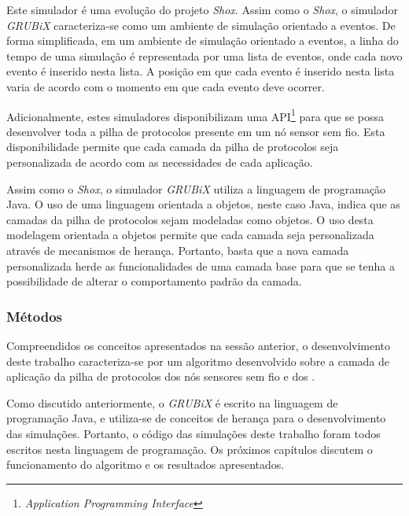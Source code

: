 Este simulador é uma evolução do projeto \emph{Shox}\cite{shox}. Assim como o \emph{Shox}, o simulador \emph{GRUBiX} caracteriza-se como um ambiente de simulação orientado a eventos. De forma simplificada, em um ambiente de simulação orientado a eventos, a linha do tempo de uma simulação é representada por uma lista de eventos, onde cada novo evento é inserido nesta lista. A posição em que cada evento é inserido nesta lista varia de acordo com o momento em que cada evento deve ocorrer.

Adicionalmente, estes simuladores disponibilizam uma API\footnote{\emph{Application Programming Interface}} para que se possa desenvolver toda a pilha de protocolos presente em um nó sensor sem fio. Esta disponibilidade permite que cada camada da pilha de protocolos seja personalizada de acordo com as necessidades de cada aplicação.

Assim como o \emph{Shox}, o simulador \emph{GRUBiX} utiliza a linguagem de programação Java. O uso de uma linguagem orientada a objetos, neste caso Java, indica que as camadas da pilha de protocolos sejam modeladas como objetos. O uso desta modelagem orientada a objetos permite que cada camada seja personalizada através de mecanismos de herança. Portanto, basta que a nova camada personalizada herde as funcionalidades de uma camada base para que se tenha a possibilidade de alterar o comportamento padrão da camada.

\subsubsection{Métodos}
Compreendidos os conceitos apresentados na sessão anterior, o desenvolvimento deste trabalho caracteriza-se por um algoritmo desenvolvido sobre a camada de aplicação da pilha de protocolos dos nós sensores sem fio e dos \vants.

Como discutido anteriormente, o \emph{GRUBiX} é escrito na linguagem de programação Java, e utiliza-se de conceitos de herança para o desenvolvimento das simulações. Portanto, o código das simulações deste trabalho foram todos escritos nesta linguagem de programação. Os próximos capítulos discutem o funcionamento do algoritmo e os resultados apresentados.




